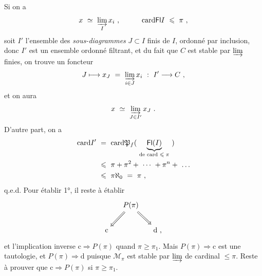 
Si on a
\[ x \ \simeq \ \varinjlim_{I} x_i \ , \qquad\quad \mathrm{card} \mathsf{Fl} I \ \leqslant \ \pi \ , \]
soit $I'$ l'ensemble des \textit{sous-diagrammes} $J \subset I$ finis de $I$, ordonné par inclusion, donc $I'$ est un ensemble ordonné filtrant, et du fait que $C$ est stable par $\varinjlim$ finies, on trouve un foncteur
\[ J \longmapsto x_J \ = \ \varinjlim_{i\in J} x_i \ : \ I' \longrightarrow C \ , \]
et on aura
\[ x \ \simeq \ \varinjlim_{J\in I'} x_J \ . \]
D'autre part, on a
\[
\begin{aligned}
\card I' \ &= \ \card \mathfrak{P}_f( \ \underbrace{\Fl(I)}_{\text{de card $\leqslant \pi$}} \ ) \\
&\leqslant \ \pi + \pi^2 + \ \cdots \ + \pi^n + \ \dots \\
&\leqslant \ \pi\aleph_0 \ = \ \pi \ ,
\end{aligned}
\]
q.e.d. Pour établir 1°, il reste à établir
\[
\begin{tikzcd}[column sep=small]
& P(\pi) \arrow[dl, Rightarrow] \arrow[dr, Rightarrow] & \\
\mathrm{c} & & \mathrm{d} \text{ ,}
\end{tikzcd}
\]
et l'implication inverse $\mathrm{c} \Longrightarrow P(\pi)$ quand $\pi \geqslant \pi_1$. Mais $P(\pi) \Longrightarrow \mathrm{c}$ est une tautologie, et $P(\pi) \Longrightarrow \mathrm{d}$ puisque $\mathcal{M}_{\pi}$ est stable par $\varinjlim$ de cardinal $\leqslant \pi$. Reste à prouver que $\mathrm{c} \Longrightarrow P(\pi)$ si $\pi \geqslant \pi_1$.

